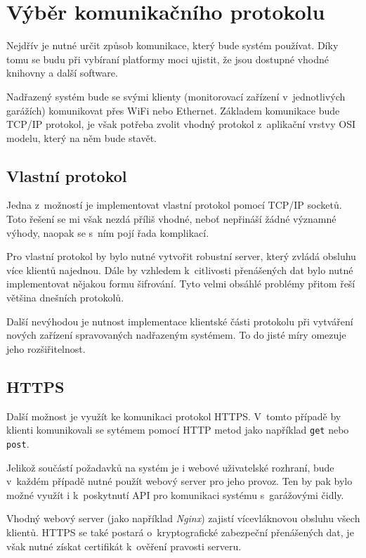 \section{Výběr komunikačního protokolu}

Nejdřív je nutné určit způsob komunikace, který bude systém používat. Díky tomu se budu při vybíraní platformy moci ujistit, že jsou dostupné vhodné knihovny a další software. 

Nadřazený systém bude se svými klienty (monitorovací zařízení v~jednotlivých garážích) komunikovat přes WiFi nebo Ethernet. Základem komunikace bude TCP/IP protokol, je však potřeba zvolit vhodný protokol z~aplikační vrstvy OSI modelu, který na něm bude stavět.

\subsection{Vlastní protokol}

Jedna z~možností je implementovat vlastní protokol pomocí TCP/IP socketů. Toto řešení se mi však nezdá příliš vhodné, neboť nepřináší žádné významné výhody, naopak se s~ním pojí řada komplikací.

Pro vlastní protokol by bylo nutné vytvořit robustní server, který zvládá obsluhu více klientů najednou. Dále by vzhledem k~citlivosti přenášených dat bylo nutné implementovat nějakou formu šifrování. Tyto velmi obsáhlé problémy přitom řeší většina dnešních protokolů.

Další nevýhodou je nutnost implementace klientské části protokolu při vytváření nových zařízení spravovaných nadřazeným systémem. To do jisté míry omezuje jeho rozšiřitelnost.

\subsection{HTTPS}

Další možnost je využít ke komunikaci protokol HTTPS. V~tomto případě by klienti komunikovali se sytémem pomocí HTTP metod jako například \verb|get| nebo \verb|post|.

Jelikož součástí požadavků na systém je i webové uživatelské rozhraní, bude v~každém případě nutné použít webový server pro jeho provoz. Ten by pak bylo možné využít i k~poskytnutí API pro komunikaci systému s~garážovými čidly.

Vhodný webový server (jako například \textit{Nginx}) zajistí vícevláknovou obsluhu všech klientů. HTTPS se také postará o~kryptografické zabezpeční přenášených dat, je však nutné získat certifikát k~ověření pravosti serveru. 

